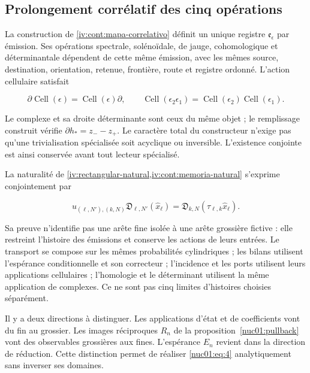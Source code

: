\subsection{Prolongement corrélatif des cinq opérations}

La construction de \cref{iv:cont:mapa-correlativo} définit un unique registre \(\mathfrak e_\epsilon\) par émission. Ses opérations spectrale, solénoïdale, de jauge, cohomologique et déterminantale dépendent de cette même émission, avec les mêmes source, destination, orientation, retenue, frontière, route et registre ordonné. L’action cellulaire satisfait


\[
\partial\operatorname{Cell}(\epsilon)=\operatorname{Cell}(\epsilon)\partial,
\qquad
\operatorname{Cell}(\epsilon_2\epsilon_1)
=\operatorname{Cell}(\epsilon_2)\operatorname{Cell}(\epsilon_1).
\]

Le complexe et sa droite déterminante sont ceux du même objet ; le remplissage construit vérifie \(\partial h_*=z_--z_+\). Le caractère total du constructeur n’exige pas qu’une trivialisation spécialisée soit acyclique ou inversible. L’existence conjointe est ainsi conservée avant tout lecteur spécialisé.

La naturalité de \cref{iv:rectangular-natural,iv:cont:memoria-natural} s’exprime conjointement par

\begin{equation}
u_{(\ell,N'),(k,N)}\mathfrak D_{\ell,N'}(\widehat x_\ell)
=\mathfrak D_{k,N}(\tau_{\ell,k}\widehat x_\ell).
\label{nuc01:eq:4}
\end{equation}

Sa preuve n’identifie pas une arête fine isolée à une arête grossière fictive : elle restreint l’histoire des émissions et conserve les actions de leurs entrées. Le transport se compose sur les mêmes probabilités cylindriques ; les bilans utilisent l’espérance conditionnelle et son correcteur ; l’incidence et les ports utilisent leurs applications cellulaires ; l’homologie et le déterminant utilisent la même application de complexes. Ce ne sont pas cinq limites d’histoires choisies séparément.

Il y a deux directions à distinguer. Les applications d’état et de coefficients vont du fin au grossier. Les images réciproques \(R_n\) de la proposition~\ref{nuc01:pullback} vont des observables grossières aux fines. L’espérance \(E_n\) revient dans la direction de réduction. Cette distinction permet de réaliser \eqref{nuc01:eq:4} analytiquement sans inverser ses domaines.


